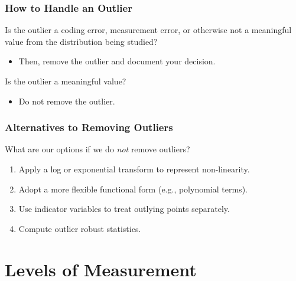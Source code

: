 \documentclass[12pt, block=fill]{beamer}
\begin{document}
\begin{frame}
  \frametitle{How to Handle an Outlier}
  Is the outlier a coding error, measurement error, or
  otherwise not a meaningful value from the distribution being
  studied?

  \begin{itemize}
  \item Then, remove the outlier and document your decision.
  \end{itemize}

  Is the outlier a meaningful value?

  \begin{itemize}
  \item Do not remove the outlier.
  \end{itemize}
\end{frame}


\begin{frame}
  \frametitle{Alternatives to Removing Outliers}

  What are our options if we do \textit{not} remove outliers?

  \begin{enumerate}

  \item Apply a log or exponential transform to represent non-linearity.
  \item Adopt a more flexible functional form (e.g., polynomial terms).
  \item Use indicator variables to treat outlying points separately.
  \item Compute outlier robust statistics.
  \end{enumerate}
\end{frame}

\section{Levels of Measurement}
\end{document}
